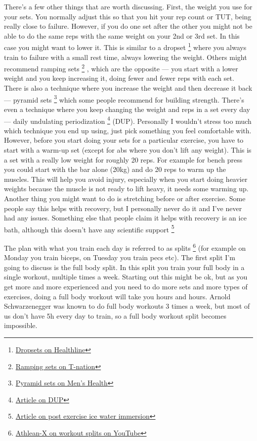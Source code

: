 \documentclass[openany, 12pt]{book}
\begin{document}
        There's a few other things that are worth discussing. First, the weight you use for your sets. You normally adjust this so that you hit your rep count or TUT, being really close to failure.
        However, if you do one set after the other you might not be able to do the same reps with the same weight on your 2nd or 3rd set. In this case you might want to lower it. This is similar to
        a dropset
        \footnote{\href{https://www.healthline.com/nutrition/what-is-a-drop-set}{Dropsets on Healthline}}
        where you always train to failure with a small rest time, always lowering the weight. Others might recommend ramping sets
        \footnote{\href{https://www.t-nation.com/training/thibaudeau-on-ramping/}{Ramping sets on T-nation}}
        , which are the opposite --- you start with a lower weight and you keep increasing it, doing fewer and fewer reps with each set. There is also a technique where you increase the weight and then
        decrease it back --- pyramid sets
        \footnote{\href{https://www.menshealth.com/fitness/a36317637/pyramid-sets/}{Pyramid sets on Men's Health}} which some people recommend for building strength. There's even a technique
        where you keep changing the weight and reps in a set every day --- daily undulating periodization
        \footnote{\href{https://pubmed.ncbi.nlm.nih.gov/11991778/}{Article on DUP}} (DUP). Personally I wouldn't stress too
        much which technique you end up using, just pick something you feel comfortable with. However, before you start doing your sets for a particular exercise, you have to start with a warm-up set
        (except for abs where you don't lift any weight).
        This is a set with a really low weight for roughly 20 reps. For example for bench press you could start with the bar alone (20kg) and do 20 reps to warm up the muscles. This will help you avoid
        injury, especially when you start doing heavier weights because the muscle is not ready to lift heavy, it needs some warming up. Another thing you might want to do is stretching before or
        after exercise. Some people say this helps with recovery, but I personally never do it and I've never had any issues. Something else that people claim it helps with recovery is an ice bath,
        although this doesn't have any scientific support
        \footnote{\href{https://www.ncbi.nlm.nih.gov/pmc/articles/PMC2938508/}{Article on post exercise ice water immersion}}

        The plan with what you train each day is referred to as splits
        \footnote{\href{https://www.youtube.com/watch?v=RDWyqnGhmWY}{Athlean-X on workout splits on YouTube}} (for example on Monday you train biceps, on Tuesday you train pecs etc).
        The first split I'm going to discuss is the full body split. In this split
        you train your full body in a single workout, multiple times a week. Starting out this might be ok, but as you get more and more experienced and you need to do more sets and more types of
        exercises, doing a full body workout will take you hours and hours. Arnold Schwarzenegger was known to do full body workouts 3 times a week, but most of us don't have 5h every day to train, so
        a full body workout split becomes impossible.
\end{document}
